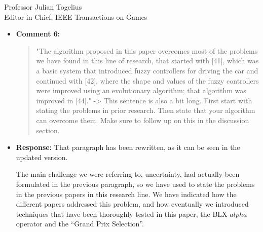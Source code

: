 \documentclass[10pt]{letter} %
\begin{document}
\begin{letter}{Professor Julian Togelius \\ Editor in Chief, IEEE Transactions on Games}
\begin{enumerate}
\begin{itemize}
				\textcolor{red}{
					" If we can eliminate individually-computed fitness
					and move to a “fitnessless” environment,, we can remove
					one source of uncertainty. We accomplish this by substituting
					a single (and uncertain) fitness by a podium (a ranking
					after several races against other opponents) in which car
					controllers that win the most races will proceed to the next
					generation, while those that do not, will simply be removed
					from the pool. We can further reduce uncertainty even more
					by repeating races several times."
				}
		\item {\bf Comment 6:}
			\begin{quote}
				"The algorithm proposed in this paper overcomes most of the problems we have found in this line of research, that started with [41], which was a basic system that introduced fuzzy controllers for driving the car and continued with [42], where the shape and values of the fuzzy controllers were improved using an evolutionary algorithm; that algorithm
				was improved in [44]." -> This sentence is also a bit long. First start with stating the problems in prior research. Then state that your algorithm can overcome them. Make sure to follow up on this in the discussion section.
			\end{quote}
		\item {\bf Response:}
                  That paragraph has been rewritten, as it can be seen
                  in the updated version.

                 The main challenge we were referring to, uncertainty, had actually been formulated in the
previous paragraph, so we have used to state the problems in the
previous papers in this research line. We have indicated how the
different papers addressed this problem, and how eventually we
introduced techniques that have been thoroughly tested in this paper,
the BLX-$alpha$ operator and the ``Grand Prix Selection''.


\end{itemize}
\end{enumerate}
\end{letter}
\end{document}
